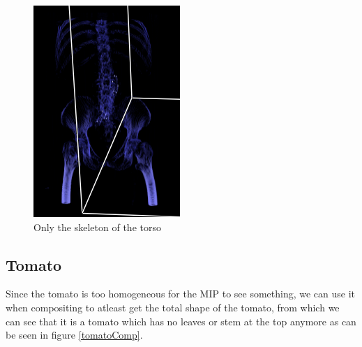 \documentclass[a4paper,twoside,11pt]{article}
\begin{document}
\begin{figure}[H]
  \includegraphics[width=\linewidth]{images/bodyComp2}
  \caption{Only the skeleton of the torso}\label{bodyComp2}
\endminipage\hfill
 \end{figure}
 
 
 \subsection{Tomato}
 Since the tomato is too homogeneous for the MIP to see something, we can use it when compositing to atleast get the total shape of the tomato, from which we can see that it is a tomato which has no leaves or stem at the top anymore as can be seen in figure \ref{tomatoComp}.
 
\end{document}

